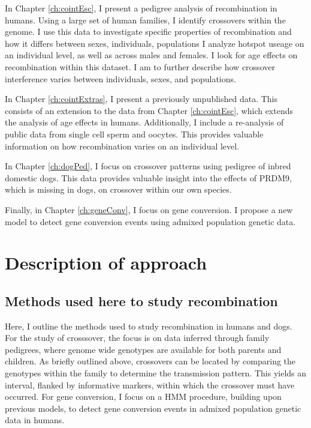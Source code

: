 In Chapter \ref{ch:cointEsc}, I present a pedigree analysis of recombination in humans.
Using a large set of human families, I identify crossovers within the genome.
I use this data to investigate specific properties of recombination and how it differs between sexes, individuals, populations
I analyze hotspot useage on an individual level, as well as across males and females.
I look for age effects on recombination within this dataset.
I am to further describe how crossover interference varies between individuals, sexes, and populations.

In Chapter \ref{ch:cointExtras}, I present a previously unpublished data.
This consists of an extension to the data from Chapter \ref{ch:cointEsc}, which extends the analysis of age effects in humans.
Additionally, I include a re-analysis of public data from single cell sperm and oocytes.
This provides valuable information on how recombination varies on an individual level.

In Chapter \ref{ch:dogPed}, I focus on crossover patterns using pedigree of inbred domestic dogs.
This data provides valuable insight into the effects of PRDM9, which is missing in dogs, on crossover within our own species.

Finally, in Chapter \ref{ch:geneConv}, I focus on gene conversion.
I propose a new model to detect gene conversion events using admixed population genetic data.



\section{Description of approach}

\subsection{Methods used here to study recombination}
Here, I outline the methods used to study recombination in humans and dogs.
For the study of crosssover, the focus is on data inferred through family pedigrees, where genome wide genotypes are available for both parents and children.
As briefly outlined above, crossovers can be located by comparing the genotypes within the family to determine the transmission pattern.
This yields an interval, flanked by informative markers, within which the crossover must have occurred.
For gene conversion, I focus on a HMM procedure, building upon previous models, to detect gene conversion events in admixed population genetic data in humans.



